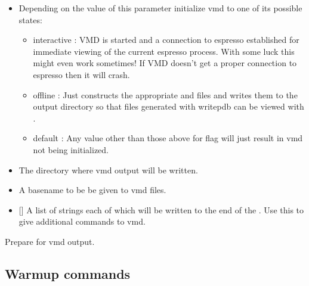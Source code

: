 \begin{itemize}
\item {} Depending on the value of this parameter initialize vmd to one of its possible states:
  \begin{itemize}
  \item interactive : VMD is started and a connection to espresso established for immediate viewing of the current espresso process. With some luck this might even work sometimes! If VMD doesn't get a proper connection to espresso then it will crash.
  \item offline : Just constructs the appropriate  and  files and writes them to the output directory so that  files generated with writepdb can be viewed with .
  \item default : Any value other than those above for flag will just result in vmd not being initialized.
  \end{itemize}
\item {} The directory where vmd output will be written.
\item {} A basename to be be given to vmd files.
\item {} [] A list of strings each of which will be written to the end of the . Use this to give additional commands to vmd.
\end{itemize}
Prepare for vmd output.

\subsection{Warmup commands}

